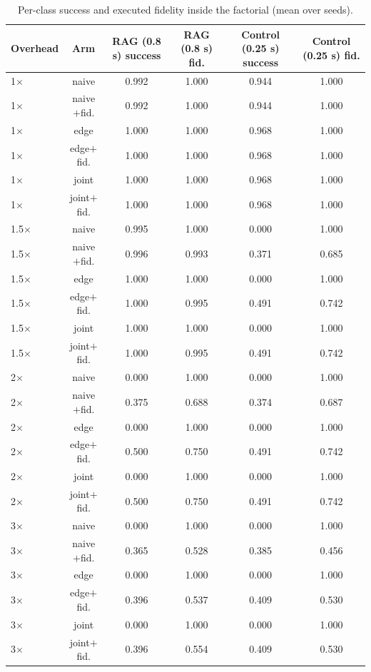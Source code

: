\begin{table}
\centering
\scriptsize
\caption{Per-class success and executed fidelity inside the factorial (mean over seeds).}
\label{tab:p2-classes2}
\begin{tabular}{lccccc}
\toprule
Overhead & Arm & RAG (0.8 s) success & RAG (0.8 s) fid. & Control (0.25 s) success & Control (0.25 s) fid. \\
\midrule
1$\times$ & naive & 0.992 & 1.000 & 0.944 & 1.000 \\
1$\times$ & naive$+$fid. & 0.992 & 1.000 & 0.944 & 1.000 \\
1$\times$ & edge & 1.000 & 1.000 & 0.968 & 1.000 \\
1$\times$ & edge$+$fid. & 1.000 & 1.000 & 0.968 & 1.000 \\
1$\times$ & joint & 1.000 & 1.000 & 0.968 & 1.000 \\
1$\times$ & joint$+$fid. & 1.000 & 1.000 & 0.968 & 1.000 \\
1.5$\times$ & naive & 0.995 & 1.000 & 0.000 & 1.000 \\
1.5$\times$ & naive$+$fid. & 0.996 & 0.993 & 0.371 & 0.685 \\
1.5$\times$ & edge & 1.000 & 1.000 & 0.000 & 1.000 \\
1.5$\times$ & edge$+$fid. & 1.000 & 0.995 & 0.491 & 0.742 \\
1.5$\times$ & joint & 1.000 & 1.000 & 0.000 & 1.000 \\
1.5$\times$ & joint$+$fid. & 1.000 & 0.995 & 0.491 & 0.742 \\
2$\times$ & naive & 0.000 & 1.000 & 0.000 & 1.000 \\
2$\times$ & naive$+$fid. & 0.375 & 0.688 & 0.374 & 0.687 \\
2$\times$ & edge & 0.000 & 1.000 & 0.000 & 1.000 \\
2$\times$ & edge$+$fid. & 0.500 & 0.750 & 0.491 & 0.742 \\
2$\times$ & joint & 0.000 & 1.000 & 0.000 & 1.000 \\
2$\times$ & joint$+$fid. & 0.500 & 0.750 & 0.491 & 0.742 \\
3$\times$ & naive & 0.000 & 1.000 & 0.000 & 1.000 \\
3$\times$ & naive$+$fid. & 0.365 & 0.528 & 0.385 & 0.456 \\
3$\times$ & edge & 0.000 & 1.000 & 0.000 & 1.000 \\
3$\times$ & edge$+$fid. & 0.396 & 0.537 & 0.409 & 0.530 \\
3$\times$ & joint & 0.000 & 1.000 & 0.000 & 1.000 \\
3$\times$ & joint$+$fid. & 0.396 & 0.554 & 0.409 & 0.530 \\
\bottomrule
\end{tabular}
\par\vspace{2pt}{\footnotesize\raggedright The control class has the tighter deadline (0.25 s) and is the one the ladder has to shed work for.\par}
\end{table}
